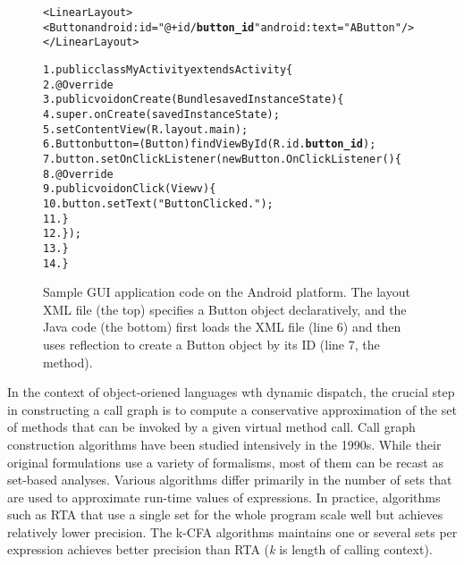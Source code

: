 \begin{figure}[t]
\begin{CodeOut}
\begin{alltt}

<LinearLayout>
    <Button android:id="@+id/\textbf{button\_id}" android:text="A Button" />
</LinearLayout>

1. public class MyActivity extends Activity \{
2.    @Override
3.    public void onCreate(Bundle savedInstanceState) \{
4.        super.onCreate(savedInstanceState);
5.        setContentView(R.layout.main);
6.        Button button = (Button) findViewById(R.id.\textbf{button\_id});
7.        button.setOnClickListener(new Button.OnClickListener() \{
8.            @Override
9.            public void onClick(View v) \{
10.               button.setText("Button Clicked.");
11.           \}
12.       \});
13.   \}
14. \}
\end{alltt}
\end{CodeOut}
\label{fig:sampleandroid}
\caption{Sample GUI application code on the Android platform. The layout
XML file (the top) specifies a Button object declaratively, 
and the Java code (the bottom)
first loads the XML file (line 6) and then uses reflection to create
a Button object by its ID (line 7, the  method).}
\end{figure}

In the context of object-oriened languages wth dynamic dispatch, the
crucial step in constructing a call graph is to compute a conservative
approximation of the set of methods that can be invoked by a given
virtual method call. Call graph construction algorithms have been
studied intensively in the 1990s. While their original formulations
use a variety of formalisms, most of them can be recast as set-based
analyses. Various algorithms differ primarily in the number of sets
that are used to approximate run-time values of expressions. 
In practice, algorithms such as RTA that use a single set for the whole
program scale well but achieves relatively lower precision.  The
k-CFA algorithms maintains one or several sets per expression achieves better
precision than RTA (\textit{k} is length of calling context).


